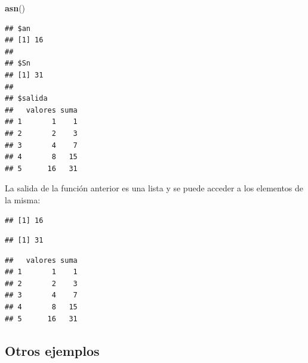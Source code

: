 \documentclass[]{book}
\newenvironment{Shaded}{\begin{snugshade}}{\end{snugshade}}
\newcommand{\KeywordTok}[1]{\textcolor[rgb]{0.13,0.29,0.53}{\textbf{#1}}}
\newcommand{\NormalTok}[1]{#1}
\newcommand{\OperatorTok}[1]{\textcolor[rgb]{0.81,0.36,0.00}{\textbf{#1}}}
\newcommand{\StringTok}[1]{\textcolor[rgb]{0.31,0.60,0.02}{#1}}
\begin{document}
\begin{Shaded}
\begin{Highlighting}[]
\KeywordTok{asn}\NormalTok{()}
\end{Highlighting}
\end{Shaded}

\begin{verbatim}
## $an
## [1] 16
## 
## $Sn
## [1] 31
## 
## $salida
##   valores suma
## 1       1    1
## 2       2    3
## 3       4    7
## 4       8   15
## 5      16   31
\end{verbatim}

La salida de la función anterior es una lista y se puede
acceder a los elementos de la misma:

\begin{Shaded}
\end{Shaded}

\begin{verbatim}
## [1] 16
\end{verbatim}

\begin{Shaded}
\end{Shaded}

\begin{verbatim}
## [1] 31
\end{verbatim}

\begin{Shaded}
\end{Shaded}

\begin{verbatim}
##   valores suma
## 1       1    1
## 2       2    3
## 3       4    7
## 4       8   15
## 5      16   31
\end{verbatim}

\hypertarget{otros-ejemplos}{%
\subsection{Otros ejemplos}\label{otros-ejemplos}}
\end{document}
